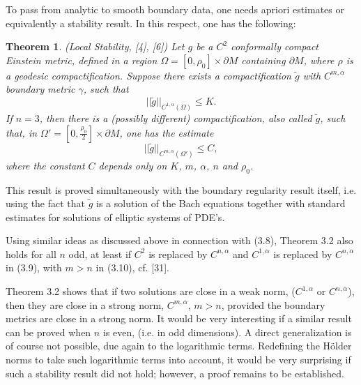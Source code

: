 \documentclass[11pt,amsfonts]{amsart}
\newtheorem{theorem}{Theorem}[section]
\begin{document}
 To pass from analytic to smooth boundary data, one needs apriori 
estimates or equivalently a stability result. In this respect, one has 
the following:

\begin{theorem} \label{t 3.2} {\rm (Local Stability, [4], [6])}
  Let $g$ be a $C^{2}$ conformally compact Einstein metric, defined in 
a region $\Omega  = [0,\rho_{0}]\times \partial M$ containing $\partial M$, 
where $\rho$ is a geodesic compactification. Suppose there exists a 
compactification $\widetilde g$ with $C^{m,\alpha}$ boundary metric 
$\gamma$, such that
\begin{equation} \label{e3.9}
||\widetilde g||_{C^{1,\alpha}(\Omega)} \leq  K. 
\end{equation}
If $n = 3$, then there is a (possibly different) compactification, 
also called $\widetilde g$, such that, in $\Omega' = [0,\frac{\rho_{0}}{2}]
\times \partial M$, one has the estimate 
\begin{equation} \label{e3.10}
||\widetilde g||_{C^{m,\alpha}(\Omega')} \leq  C, 
\end{equation}
where the constant $C$ depends only on $K$, $m$, $\alpha$, $n$ and 
$\rho_{0}$. 
\end{theorem}

  This result is proved simultaneously with the boundary regularity result 
itself, i.e. using the fact that $\widetilde g$ is a solution of the Bach 
equations together with standard estimates for solutions of elliptic systems 
of PDE's. 

  Using similar ideas as discussed above in connection with (3.8), Theorem 3.2 
also holds for all $n$ odd, at least if $C^{2}$ is replaced by $C^{n,\alpha}$ 
and $C^{1,\alpha}$ is replaced by $C^{n,\alpha}$ in (3.9), with $m > n$ in 
(3.10), cf. [31]. 

\medskip

 Theorem 3.2 shows that if two solutions are close in a weak norm, 
($C^{1,\alpha}$ or $C^{n,\alpha}$), then they are close in a strong norm, 
$C^{m,\alpha}$, $m > n$, provided the boundary metrics are 
close in a strong norm. It would be very interesting if a similar 
result can be proved when $n$ is even, (i.e. in odd dimensions). A 
direct generalization is of course not possible, due again to the 
logarithmic terms. Redefining the H\"older norms to take such logarithmic 
terms into account, it would be very surprising if such a stability 
result did not hold; however, a proof remains to be established. 
\end{document}
